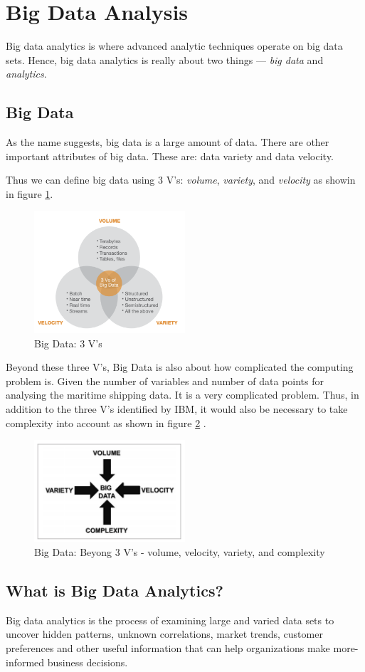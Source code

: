 \section{Big Data Analysis}

Big data analytics is where advanced analytic techniques operate on big data sets. Hence, big data
analytics is really about two things — \textit{big data} and \textit{analytics}.



\subsection{Big Data}

As the name suggests, big data is a large amount of data. There are other important attributes of big data. These are:  data variety and data velocity.

Thus we can define big data using 3 V's: \textit{volume}, \textit{variety}, and \textit{velocity} as showin in figure \ref*{bigData}.

\begin{figure}[h]
    \centering
    \includegraphics[width=0.5\textwidth]{images/big_data.png}
    \caption{Big Data: 3 V's \autocite{3vbigdata}}
    \label{bigData}
\end{figure}

Beyond these three V's, Big Data is also about how complicated the computing
problem is. Given the number of variables and number of data points for analysing the maritime shipping data. It is a very complicated problem.
Thus, in addition to the three V's identified by IBM, it would also be necessary to take complexity into account as shown in figure \ref*{bigDataComplex} \autocite{pence2014big}.

\begin{figure}[h]
    \centering
    \includegraphics[width=0.5\textwidth]{images/big_data_complex.png}
    \caption{Big Data: Beyong 3 V's - volume, velocity,
        variety, and complexity}
    \label{bigDataComplex}
\end{figure}


\subsection{What is Big Data Analytics?}

Big data analytics is the process of examining large and varied data sets to uncover hidden patterns, unknown correlations, market trends, customer preferences and other useful information that can help organizations make more-informed business decisions.